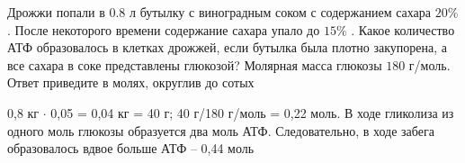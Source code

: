 
Дрожжи попали в 0.8 л бутылку с виноградным соком с
содержанием сахара $20\%$ . После некоторого времени содержание сахара упало до
$15\%$ . Какое количество АТФ образовалось в клетках дрожжей, если бутылка была
плотно закупорена, а все сахара в соке представлены глюкозой?  Молярная масса глюкозы $180$  г/моль. Ответ
приведите в молях, округлив до сотых

\solutionSection

0,8 кг $\cdot$ 0,05 = 0,04 кг = 40 г; 40 г/180 г/моль = 0,22 моль. В ходе гликолиза из одного моль глюкозы образуется два моль АТФ. Следовательно, в ходе забега образовалось вдвое больше АТФ – 0,44 моль

